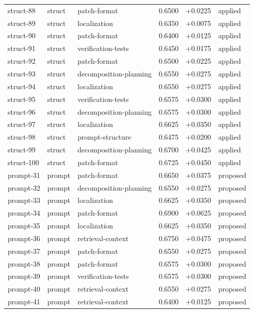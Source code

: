 \begin{center}
\begin{longtable}{llp{5.2cm}rrl}
struct-88 & struct & patch-format & 0.6500 & +0.0225 & applied \\
struct-89 & struct & localization & 0.6350 & +0.0075 & applied \\
struct-90 & struct & patch-format & 0.6400 & +0.0125 & applied \\
struct-91 & struct & verification-tests & 0.6450 & +0.0175 & applied \\
struct-92 & struct & patch-format & 0.6500 & +0.0225 & applied \\
struct-93 & struct & decomposition-planning & 0.6550 & +0.0275 & applied \\
struct-94 & struct & localization & 0.6550 & +0.0275 & applied \\
struct-95 & struct & verification-tests & 0.6575 & +0.0300 & applied \\
struct-96 & struct & decomposition-planning & 0.6575 & +0.0300 & applied \\
struct-97 & struct & localization & 0.6625 & +0.0350 & applied \\
struct-98 & struct & prompt-structure & 0.6475 & +0.0200 & applied \\
struct-99 & struct & decomposition-planning & 0.6700 & +0.0425 & applied \\
struct-100 & struct & patch-format & 0.6725 & +0.0450 & applied \\
prompt-31 & prompt & patch-format & 0.6650 & +0.0375 & proposed \\
prompt-32 & prompt & decomposition-planning & 0.6550 & +0.0275 & proposed \\
prompt-33 & prompt & localization & 0.6625 & +0.0350 & proposed \\
prompt-34 & prompt & patch-format & 0.6900 & +0.0625 & proposed \\
prompt-35 & prompt & localization & 0.6625 & +0.0350 & proposed \\
prompt-36 & prompt & retrieval-context & 0.6750 & +0.0475 & proposed \\
prompt-37 & prompt & patch-format & 0.6550 & +0.0275 & proposed \\
prompt-38 & prompt & patch-format & 0.6575 & +0.0300 & proposed \\
prompt-39 & prompt & verification-tests & 0.6575 & +0.0300 & proposed \\
prompt-40 & prompt & retrieval-context & 0.6550 & +0.0275 & proposed \\
prompt-41 & prompt & retrieval-context & 0.6400 & +0.0125 & proposed \\

\end{longtable}
\end{center}
